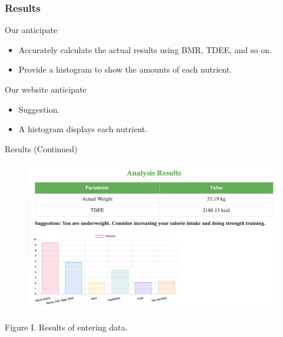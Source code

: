 \documentclass[fleqn]{beamer}
\begin{document}
\begin{frame}
\frametitle{Results}
\begin{minipage}[t]{0.48\textwidth}
\begin{block}{Our anticipate}
\begin{itemize}
\item Accurately calculate the actual results using BMR, TDEE, and so on. \\
\item Provide a histogram to show the amounts of each nutrient. 
\end{itemize}
\end{block}
\end{minipage}
\hfill
\begin{minipage}[t]{0.48\textwidth}
\begin{block}{Our website anticipate}
\begin{itemize}
\item Suggestion.
\item A histogram displays each nutrient.
\end{itemize}
\end{block}
\end{minipage}
\end{frame}
\begin{frame}{Results (Continued)}
\begin{figure}[h]
\centering
\includegraphics[width=\textwidth]{Example.jpg}
\end{figure}
\centering
Figure I. Results of entering data.
\end{frame}
\end{document}
